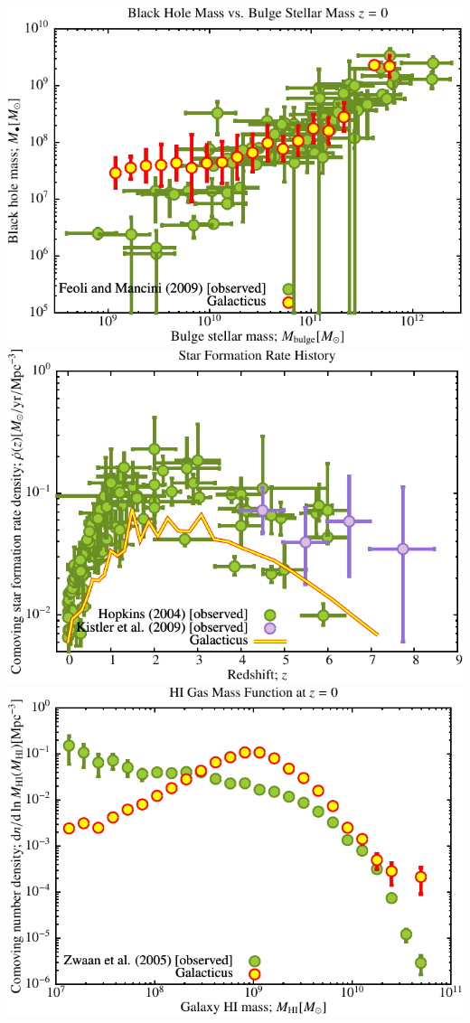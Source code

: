 \includegraphics[scale=0.6]{r256/h70/red_st14_log1/Plot_Black_Hole_vs_Bulge_Mass.pdf}
\includegraphics[scale=0.6]{r256/h70/red_st14_log1/Plot_Star_Formation_History.pdf} \\
\includegraphics[scale=0.6]{r256/h70/red_st14_log1/Plot_HI_Mass_Function.pdf}

